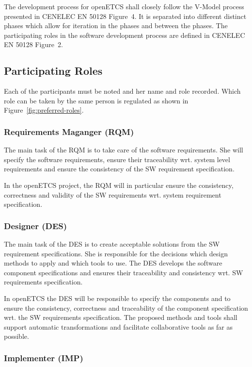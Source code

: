 
The development process for openETCS shall closely follow the V-Model process
presented in CENELEC EN 50128 Figure~4. It is separated into different distinct
phases which allow for iteration in the phases and between the phases. The
participating roles in the software development process are defined in CENELEC
EN 50128 Figure~2.

\subsection{Participating Roles}
\label{sec:participating-roles}

Each of the participants must be noted and her name and role recorded. Which
role can be taken by the same person is regulated as shown in
Figure~\ref{fig:preferred-roles}.

\subsubsection{Requirements Maganger (RQM)}
\label{sec:requ-magang-rqm}

The main task of the RQM is to take care of the software requirements. She will
specify the software requirements, ensure their traceability wrt. system level
requirements and ensure the consistency of the SW requirement specification.

In the openETCS project, the RQM will in particular ensure the consistency,
correctness and validity of the SW requirements wrt. system requirement
specification.

\subsubsection{Designer (DES)}
\label{sec:designer}

The main task of the DES is to create acceptable solutions from the SW
requirement specifications. She is responsible for the decisions which design
methods to apply and which tools to use. The DES develops the software component
specifications and ensures their traceability and consistency wrt. SW
requirements specification.

In openETCS the DES will be responsible to specify the components and to ensure
the consistency, correctness and traceability of the component specification
wrt. the SW requirements specification. The proposed methods and tools shall
support automatic transformations and facilitate collaborative tools as far as
possible.

\subsubsection{Implementer (IMP)}
\label{sec:implementer}

